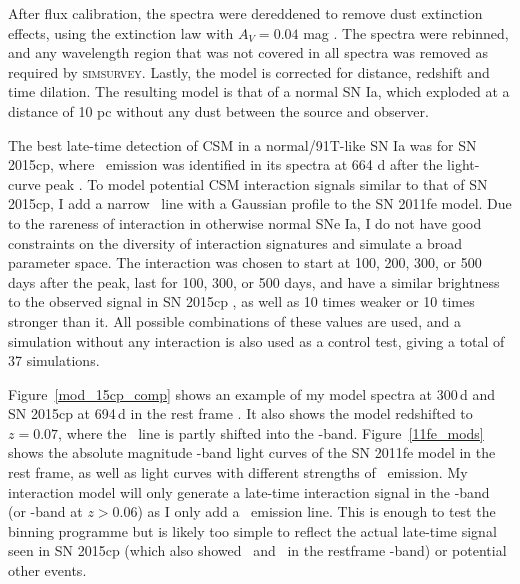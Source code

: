 \documentclass[a4paper,oneside,12pt, class=Latex/Classes/PhDthesisPSnPDF, crop=false]{standalone}
\begin{document}
After flux calibration, the spectra were dereddened to remove dust extinction effects, using the \citet{ccm89_extinction_law} extinction law with $A_V = 0.04$ mag \citep{extinction_Av}. The spectra were rebinned, and any wavelength region that was not covered in all spectra was removed as required by \textsc{simsurvey}. Lastly, the model is corrected for distance, redshift and time dilation. The resulting model is that of a normal SN Ia, which exploded at a distance of 10 pc without any dust between the source and observer.

 The best late-time detection of CSM in a normal/91T-like SN Ia was for SN 2015cp, where \Halpha\ emission was identified in its spectra at 664 d after the light-curve peak \citep{2015cp}. To model potential CSM interaction signals similar to that of SN 2015cp, I add a narrow \Halpha~line with a Gaussian profile to the SN 2011fe model. Due to the rareness of interaction in otherwise normal SNe Ia, I do not have good constraints on the diversity of interaction signatures and simulate a broad parameter space. The interaction was chosen to start at 100, 200, 300, or 500 days after the peak, last for 100, 300, or 500 days, and have a similar brightness to the observed signal in SN 2015cp \citep{2015cp}, as well as 10 times weaker or 10 times stronger than it. All possible combinations of these values are used, and a simulation without any interaction is also used as a control test, giving a total of 37 simulations. 

Figure~\ref{mod_15cp_comp} shows an example of my model spectra at 300\,d and SN 2015cp at 694\,d in the rest frame \citep{2015cp}. It also shows the model redshifted to $z = 0.07$, where the \Halpha~line is partly shifted into the \ztfi-band. Figure~\ref{11fe_mods} shows the absolute magnitude \ztfr\ztfi-band light curves of the SN 2011fe model in the rest frame, as well as light curves with different strengths of \Halpha~emission. My interaction model will only generate a late-time interaction signal in the \ztfr-band (or \ztfi-band at $z > 0.06$) as I only add a \Halpha\ emission line. This is enough to test the binning programme but is likely too simple to reflect the actual late-time signal seen in SN 2015cp (which also showed \OI\ and \CaII\ in the restframe \ztfi-band) or potential other events.
\end{document}
